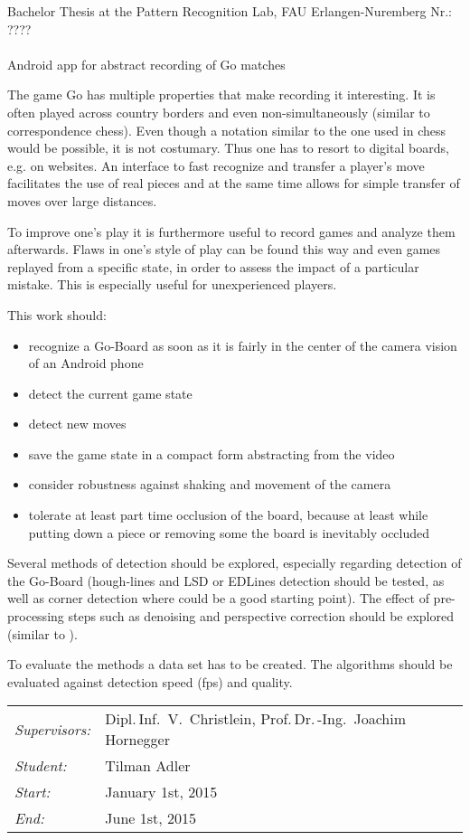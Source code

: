 \documentclass[12pt,a4paper]{article}
\begin{document}
\begin{center}
Bachelor Thesis at the Pattern Recognition Lab, FAU Erlangen-Nuremberg \hfill Nr.: ????\\[5mm]

\mbox{}\\
{\Large Android app for abstract recording of Go matches}
\end{center}

The game Go has multiple properties that make recording it interesting.
It is often played across country borders and even non-simultaneously (similar to correspondence chess). Even though a
notation similar to the one used in chess would be possible, it is not costumary. Thus one has to resort to digital
boards, e.g. on websites. An interface to fast recognize and transfer a player's move facilitates the use of real
pieces and at the same time allows for simple transfer of moves over large distances.

To improve one's play it is furthermore useful to record games and analyze them afterwards. Flaws in one's style of play
can be found this way and even games replayed from a specific state, in order to assess the impact of a particular
mistake. This is especially useful for unexperienced players.

This work should:
\begin{itemize}
	\item recognize a Go-Board  as soon as it is fairly in the center of the camera vision of an Android phone
	\item detect the current game state
	\item detect new moves
	\item save the game state in a compact form abstracting from the video
	\item consider robustness against shaking and movement of the camera
	\item tolerate at least part time occlusion of the board, because at least while putting down a piece or removing
	 some the board is inevitably occluded
\end{itemize}

Several methods of detection should be explored, especially regarding detection of the Go-Board (hough-lines and
LSD\cite{von2010lsd} or EDLines\cite{akinlar2011edlines} detection should be tested, as well as corner detection where
\cite{rosten2010faster} could be a good starting point). The effect of pre-processing steps such as denoising and
perspective correction should be explored (similar to \cite{jagannathan2005perspective}).

To evaluate the methods a data set has to be created. The algorithms should be evaluated against detection speed (fps)
and quality.

\begin{tabular}{ll}
\emph{Supervisors:} & Dipl.\,Inf.~V.~Christlein, Prof.\,Dr.\,-Ing.\ Joachim Hornegger\\
\emph{Student:} & Tilman Adler \\
\emph{Start:} & January 1st, 2015\\
\emph{End:} & June 1st, 2015\\
\end{tabular}
\nopagebreak[4]
\small


\end{document}

